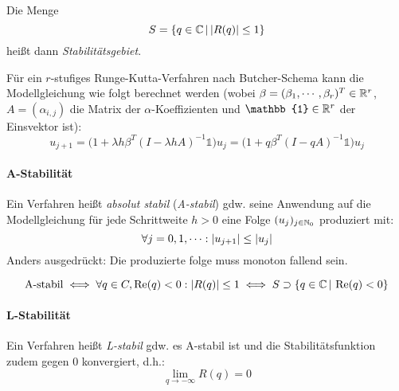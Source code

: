 					Die Menge \[ S = \{ q \in \mathbb{C} \,\vert\, \abs{R(q)} \leq 1 \} \] heißt dann \textit{Stabilitätsgebiet}.

					Für ein \(r\)-stufiges Runge-Kutta-Verfahren nach Butcher-Schema kann die Modellgleichung wie folgt berechnet werden (wobei \( \beta = (\beta_1, \cdots, \beta_r)^T \in \mathbb{R}^r \), \( A = (\alpha_{i,j}) \) die Matrix der \(\alpha\)-Koeffizienten und \( \mathbb{1} \in \R^r \) der Einsvektor ist):
					\begin{equation*}
						u_{j+1} = \big( 1 + \lambda h \beta^T (I - \lambda h A)^{-1} \mathbb{1} \big) u_j = \big( 1 + q \beta^T (I - qA)^{-1} \mathbb{1} \big) u_j
					\end{equation*}

				\paragraph{A-Stabilität}
					Ein Verfahren heißt \textit{absolut stabil} (\textit{A-stabil}) gdw. seine Anwendung auf die Modellgleichung für jede Schrittweite \( h > 0 \) eine Folge \( (u_j)_{j \in \mathbb{N}_0} \) produziert mit:
					\begin{equation*}
						\forall j = 0, 1, \cdots : \abs{u_{j+1}} \leq \abs{u_j}
					\end{equation*}
					Anders ausgedrückt: Die produzierte folge muss monoton fallend sein.

					\begin{equation*}
						\textrm{A-stabil} \iff \forall q \in C, \Re(q) < 0 : \abs{R(q)} \leq 1 \iff S \supset \{ q \in \mathbb{C} \,\vert\, \Re(q) < 0 \}
					\end{equation*}

				\paragraph{L-Stabilität}
					Ein Verfahren heißt \textit{L-stabil} gdw. es A-stabil ist und die Stabilitätsfunktion zudem gegen \(0\) konvergiert, d.h.:
					\begin{equation*}
						\lim\limits_{q \rightarrow -\infty} R(q) = 0
					\end{equation*}

